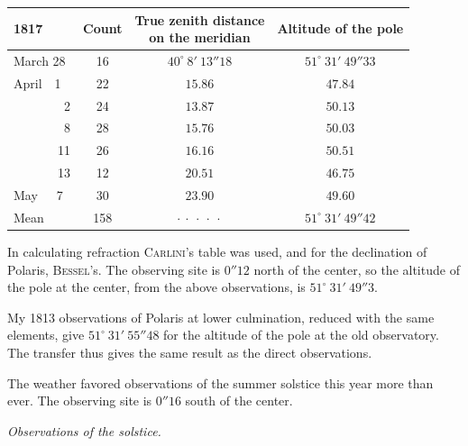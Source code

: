 \begin{center}\fontsize{10}{12}\selectfont\setlength{\tabcolsep}{3pt}
\begin{tabular}{l|c|c|c}
1817 & Count & \shortstack{True zenith distance\\on the meridian} & Altitude of the pole \\
\hline
March 28 & 16 & $40^\circ\ 8'\ 13''18$ & $51^\circ\ 31'\ 49''33$ \\
April\ \ 1 & 22 & $15.86$ & $47.84$ \\
\ \ \ \ \ \ \ \ 2 & 24 & $13.87$ & $50.13$ \\
\ \ \ \ \ \ \ \ 8 & 28 & $15.76$ & $50.03$ \\
\ \ \ \ \ \ \ 11 & 26 & $16.16$ & $50.51$ \\
\ \ \ \ \ \ \ 13 & 12 & $20.51$ & $46.75$ \\
May\ \ \ 7 & 30 & $23.90$ & $49.60$ \\
Mean & 158 & $\cdot\ \cdot\ \cdot\ \cdot\ \cdot$ & $51^\circ\ 31'\ 49''42$ \\
\end{tabular}
\end{center}

\par\indent In calculating refraction \textsc{Carlini}’s table was used, and for the declination of Polaris, \textsc{Bessel}’s. The observing site is $0''12$ north of the center, so the altitude of the pole at the center, from the above observations, is $51^\circ\ 31'\ 49''3$.

\par\indent My 1813 observations of Polaris at lower culmination, reduced with the same elements, give $51^\circ\ 31'\ 55''48$ for the altitude of the pole at the old observatory. The transfer thus gives the same result as the direct observations.

\par\indent The weather favored observations of the summer solstice this year more than ever. The observing site is $0''16$ south of the center.

\par\indent\emph{Observations of the solstice.}

